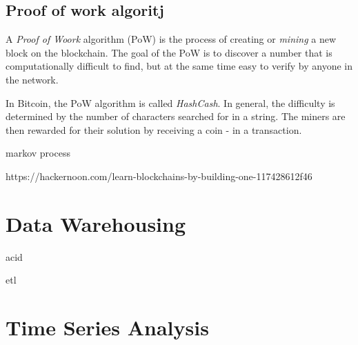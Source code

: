 \documentclass[11pt]{article}
\theoremstyle{plain}
\theoremstyle{definition}
\begin{document}
\subsection{Proof of work algoritj}
A \textit{Proof of Woork} algorithm (PoW) is the process of creating or \textit{mining} a new block on the blockchain. The goal of the PoW is to discover a number that is computationally difficult to find, but at the same time easy to verify by anyone in the network.

In Bitcoin, the PoW algorithm is called \textit{HashCash}. In general, the difficulty is determined by the number of characters searched for in a string. The miners are then rewarded for their solution by receiving a coin -  in a transaction.


markov process

https://hackernoon.com/learn-blockchains-by-building-one-117428612f46

\section{Data Warehousing}
acid

etl 

\section{Time Series Analysis}
\end{document}
